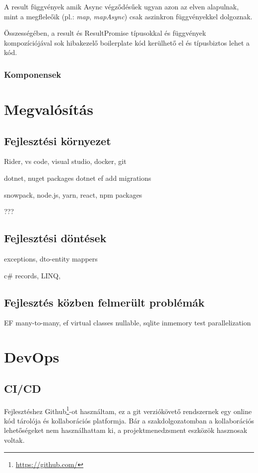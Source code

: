 A result függvények amik Async végződésűek ugyan azon az elven alapulnak, mint a megfleleőik (pl.: \textit{map}, \textit{mapAsync}) csak aszinkron függvényekkel dolgoznak.

Összességében, a result és ResultPromise típusokkal és függvények kompozíciójával sok hibakezelő boilerplate kód kerülhető el és típusbiztos lehet a kód.

\subsubsection{Komponensek}

\section{Megvalósítás}
\subsection{Fejlesztési környezet}
Rider, vs code, visual studio, docker, git

dotnet, nuget packages
dotnet ef add migrations

snowpack, node.js, yarn, react, npm packages

???

\subsection{Fejlesztési döntések}
exceptions, dto-entity mappers

c\# records, LINQ, 

\subsection{Fejlesztés közben felmerült problémák}
\label{sec:devProblems}
EF many-to-many, ef virtual classes nullable, sqlite inmemory test parallelization


\section{DevOps}
\subsection{CI/CD}
Fejlesztéshez Github\footnote{\url{https://github.com/}}-ot használtam, ez a git verziókövető rendszernek egy online kód tárolója és kollaborációs platformja. Bár a szakdolgozatomban a kollaborációs lehetőségeket nem használhattam ki, a projektmenedzsment eszközök hasznosak voltak.

